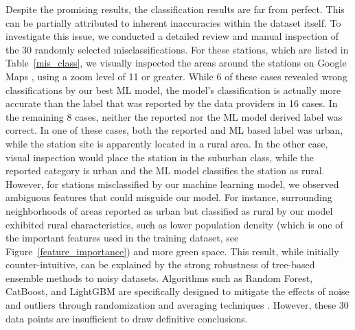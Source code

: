 \documentclass[gmd, manuscript]{copernicus}
\begin{document}
Despite the promising results, the classification results are far from perfect. This can be partially attributed to inherent inaccuracies within the dataset itself. To investigate this issue, we conducted a detailed review and manual inspection of the 30   randomly selected misclassifications. For these stations, which are listed in Table~\ref{mis_class}, we visually inspected the areas around the stations on Google Maps \cite{mehta2019google}, using a zoom level of 11 or greater. While 6 of these cases revealed wrong classifications by our best ML model, the model's classification is actually more accurate than the label that was reported by the data providers in 16  cases. In the remaining 8 cases, neither the reported nor the ML model derived label was correct. In one of these cases, both the reported and ML based label was urban, while the station site is apparently located in a rural area. In the other case, visual inspection would place the station in the suburban class, while the reported category is urban and the ML model classifies the station as rural. However, for stations misclassified by our machine learning model, we observed ambiguous features that could misguide our model. For instance, surrounding neighborhoods of areas reported as urban but classified as rural by our model exhibited rural characteristics, such as lower population density (which is one of the important features used in the training dataset, see Figure~\ref{feature_importance}) and more green space. This result, while initially counter-intuitive, can be explained by the strong robustness of tree-based ensemble methods to noisy datasets. Algorithms such as Random Forest, CatBoost, and LightGBM are specifically designed to mitigate the effects of noise and outliers through randomization and averaging techniques \citep{biau2016random}. However, these 30 data points are insufficient to draw definitive conclusions. 
\end{document}
